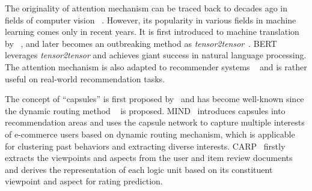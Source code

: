 
The originality of attention mechanism can be traced back to decades ago in fields of computer vision ~\cite{burt1988attention,sun2003object}. However, its popularity in various fields in machine learning comes only in recent years. It is first introduced to machine translation by ~\cite{bahdanau2014neural}, and later becomes an outbreaking method as \textit{tensor2tensor}~\cite{vaswani2017attention}. BERT ~\cite{devlin2018bert} leverages \textit{tensor2tensor} and achieves giant success in natural language processing. 
The attention mechanism is also adapted to recommender systems ~\cite{zhou2018atrank,cen2019representation} and is rather useful on real-world recommendation tasks. 


The concept of ``capsules'' is first proposed by~\cite{hinton2011transforming} and has become well-known since the dynamic routing method ~\cite{sabour2017dynamic} is proposed. 
MIND~\cite{li2019multi} introduces capsules into recommendation areas and uses the capsule network to capture multiple interests of e-commerce users based on dynamic routing mechanism, which is applicable for clustering past behaviors and extracting diverse interests. CARP~\cite{li2019capsule} firstly extracts the viewpoints and aspects from the user and item review documents and derives the representation of each logic unit based on its constituent viewpoint and aspect for rating prediction.

